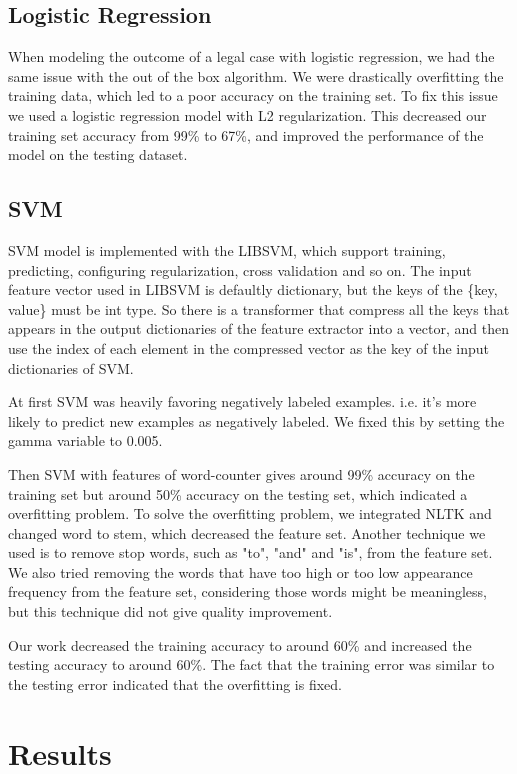 \documentclass[journal]{IEEEtran}
\begin{document}
\subsection{Logistic Regression}

When modeling the outcome of a legal case with logistic regression, we had the same issue with the out of the box algorithm. We were drastically overfitting the training data, which led to a poor accuracy on the training set. To fix this issue we used a logistic regression model with L2 regularization. This decreased our training set accuracy from 99\% to 67\%, and improved the performance of the model on the testing dataset. 

\subsection{SVM}

SVM model is implemented with the LIBSVM, which support training, predicting, configuring regularization, cross validation and so on. The input feature vector used in LIBSVM is defaultly dictionary, but the keys of the \{key, value\} must be int type.
So there is a transformer that compress all the keys that appears in the output dictionaries of the feature extractor into a vector, and then use the index of each element in the compressed vector as the key of the input dictionaries of SVM. 

At first SVM was heavily favoring negatively labeled examples. i.e. it's more likely to predict new examples as negatively labeled. We fixed this by setting the gamma variable to 0.005.

Then SVM with features of word-counter gives around 99\% accuracy on the training set but around 50\% accuracy on the testing set, which indicated a overfitting problem. To solve the overfitting problem, we integrated NLTK and changed word to stem, which decreased the feature set. Another technique we used is to remove stop words, such as "to", "and" and "is", from the feature set. We also tried removing the words that have too high or too low appearance frequency from the feature set, considering those words might be meaningless, but this technique did not give quality improvement.

Our work decreased the training accuracy to around 60\% and increased the testing accuracy to around 60\%. The fact that the training error was similar to the testing error indicated that the overfitting is fixed. 

\section{Results}
\end{document}
